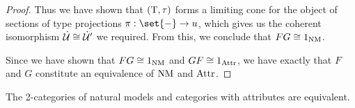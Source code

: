 \documentclass[../thesis.tex]{subfiles}
\begin{document}
\begin{proof}
  Thus we have shown that $({{\mathrm{T}}},\tau)$ forms a limiting cone for the object of sections of type projections $\pi : \set{-} \to
  u$, which gives us the coherent isomorphism $\dot{{\mathcal{U}}} \cong \dot{{\mathcal{U}}}'$ we required. From this, we conclude that $FG \cong 1_{\mathrm{NM}}$.

  Since we have shown that $FG \cong 1_{\mathrm{NM}}$ and $GF \cong 1_{\mathrm{Attr}}$, we have exactly that $F$ and $G$ constitute an equivalence
  of ${\mathrm{NM}}$ and ${\mathrm{Attr}}$.
\end{proof}

\begin{corollary}
  The 2-categories of natural models and categories with attributes are equivalent.
\end{corollary}

%
%
%
\end{document}
